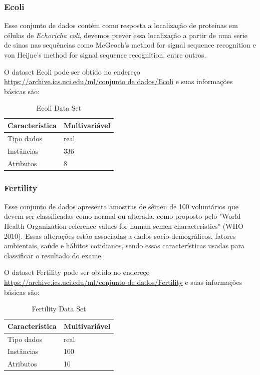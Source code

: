 \documentclass[12pt, a4paper]{article}
\begin{document}
\subsubsection{Ecoli}
Esse  conjunto de dados contém como resposta a localização de proteínas em células de \emph{Echoricha coli}, devemos prever essa localização a partir de uma serie de sinas nas sequências como McGeoch's method for signal sequence recognition e von Heijne's method for signal sequence recognition, entre outros.

O dataset Ecoli pode ser obtido no endereço \url{https://archive.ics.uci.edu/ml/conjunto de dados/Ecoli} e suas informações básicas são:
\begin{table}[!ht]
\centering
\caption{Ecoli Data Set}
\label{ecolitable}
\begin{tabular}{|l|l|}
\hline
Característica & Multivariável\\
\hline
Tipo dados & real\\
\hline
Instâncias & 336\\
\hline
Atributos & 8 \\
\hline
\end{tabular}
\end{table}

\subsubsection{Fertility}

Esse conjunto de dados apresenta amostras de sêmen de 100 voluntários que devem ser classificadas como normal ou alterada, como proposto pelo "World Health Organization reference values for human semen characteristics" (WHO 2010). Essas alterações estão associadas a dados socio-demográficos, fatores ambientais, saúde e hábitos cotidianos, sendo essas características usadas para classificar o resultado do exame.	

O dataset Fertility pode ser obtido no endereço \url{https://archive.ics.uci.edu/ml/conjunto de dados/Fertility} e suas informações básicas são:
\begin{table}[!ht]
\centering
\caption{Fertility Data Set}
\label{fertilitytable}
\begin{tabular}{|l|l|}
\hline
Característica & Multivariável\\
\hline
Tipo dados & real\\
\hline
Instâncias & 100\\
\hline
Atributos & 10 \\
\hline
\end{tabular}
\end{table}
\end{document}
